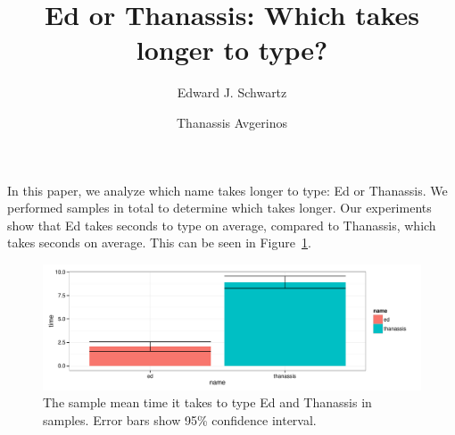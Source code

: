\documentclass{article}
\author{Edward J. Schwartz \and Thanassis Avgerinos}
\title{Ed or Thanassis: Which takes longer to type?}
\begin{document}
\maketitle

In this paper, we analyze which name takes longer to type: Ed or
Thanassis.  We performed \numsamples samples in total to determine
which takes longer.  Our experiments show that Ed takes \edmean
seconds to type on average, compared to Thanassis, which takes
\thanassismean seconds on average.  This can be seen in
Figure~\ref{fig:hist}.

\begin{figure}
\includegraphics[width=\textwidth]{histsummary.pdf}
\caption{The sample mean time it takes to type Ed and Thanassis in
  \numsamples samples.  Error bars show 95\% confidence interval.}
\label{fig:hist}
\end{figure}
\end{document}
